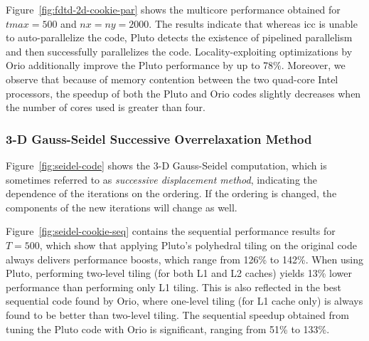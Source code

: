  
Figure~\ref{fig:fdtd-2d-cookie-par} shows the multicore performance
obtained for $tmax=500$ and $nx=ny=2000$. The results indicate that
whereas icc is unable to auto-parallelize the code, Pluto detects the
existence of pipelined parallelism and then successfully parallelizes
the code. Locality-exploiting optimizations by Orio additionally
improve the Pluto performance by up to 78\%. Moreover, we observe
that because of memory contention between the two quad-core Intel
processors, the speedup of both the Pluto and Orio codes slightly
decreases when the number of cores used is greater than four.
 

\subsubsection{3-D Gauss-Seidel Successive Overrelaxation Method}  
Figure~\ref{fig:seidel-code} shows the 3-D Gauss-Seidel computation, 
which is sometimes referred to as
\emph{successive displacement method}, indicating the dependence of the 
iterations on the ordering. If the ordering is changed, the components
of the new iterations will change as well.

Figure~\ref{fig:seidel-cookie-seq} contains the sequential performance
results for $T=500$, which show that applying Pluto's polyhedral
tiling on the original code always delivers performance boosts, which
range from 126\% to 142\%. When using Pluto, performing two-level
tiling (for both L1 and L2 caches) yields 13\% lower performance than
performing only L1 tiling. This is also reflected in the best
sequential code found by Orio, where one-level tiling (for L1 cache
only) is always found to be better than two-level tiling. The
sequential speedup obtained from tuning the Pluto code with Orio is
significant, ranging from 51\% to 133\%.

